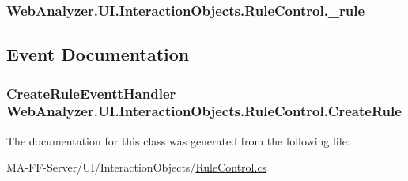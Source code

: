 \subsubsection[{\+\_\+rule}]{ Web\+Analyzer.\+U\+I.\+Interaction\+Objects.\+Rule\+Control.\+\_\+rule\hspace{0.3cm}{\ttfamily [private]}}\label{class_web_analyzer_1_1_u_i_1_1_interaction_objects_1_1_rule_control_aa89ec17ff2fc96e2868147d3a1bfe474}


\subsection{Event Documentation}
\hypertarget{class_web_analyzer_1_1_u_i_1_1_interaction_objects_1_1_rule_control_a7bf67a13195858fc69b81997bb629ec5}{}
\subsubsection[{Create\+Rule}]{\setlength{\rightskip}{0pt plus 5cm}Create\+Rule\+Eventt\+Handler Web\+Analyzer.\+U\+I.\+Interaction\+Objects.\+Rule\+Control.\+Create\+Rule}\label{class_web_analyzer_1_1_u_i_1_1_interaction_objects_1_1_rule_control_a7bf67a13195858fc69b81997bb629ec5}


The documentation for this class was generated from the following file\+:\begin{DoxyCompactItemize}
\item 
M\+A-\/\+F\+F-\/\+Server/\+U\+I/\+Interaction\+Objects/\hyperlink{_rule_control_8cs}{Rule\+Control.\+cs}\end{DoxyCompactItemize}
